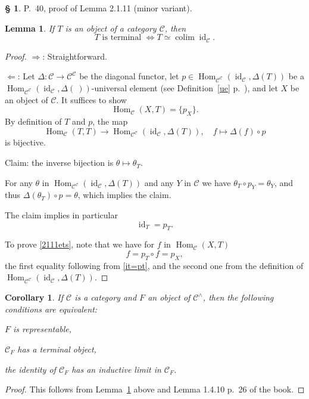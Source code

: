 \documentclass[12pt]{article}%
\newtheorem{lem}[thm]{Lemma}
\newtheorem{cor}[thm]{Corollary}
\theoremstyle{remark}
\theoremstyle{definition}
\newtheorem{s}[thm]{\S}%
\newcommand{\nn}{\noindent}
\newcommand{\C}{\mathcal C}
\newcommand{\si}{\Leftarrow}
\newcommand{\ssi}{\Leftrightarrow}%
\newcommand{\then}{\Rightarrow}
\DeclareMathOperator*{\colim}{colim}%
\DeclareMathOperator{\id}{id}
\DeclareMathOperator{\Hom}{Hom}%
\begin{document}
\begin{s} 
P.~40, proof of Lemma 2.1.11 (minor variant).

\begin{lem}\label{l2111}
If $T$ is an object of a category $\C$, then 
$$
T\text{ is terminal }\ssi T\simeq\colim\id_\C.
$$
\end{lem}

\begin{proof} $\then$: Straightforward.

\nn$\si$: Let $\Delta:\C\to\C^\C$ be the diagonal functor, let $p\in\Hom_{\C^\C}(\id_\C,\Delta(T))$ be a $\Hom_{\C^\C}(\id_\C,\Delta(\ ))$\--universal element  (see Definition~\ref{ue} p.~\pageref{ue}), and let $X$ be an object of $\C$. It suffices to show 
%
\begin{equation}\label{2111ets}
\Hom_\C(X,T)=\{p_X\}.
\end{equation}
% 
By definition of $T$ and $p$, the map 
$$
\Hom_\C(T,T)\to\Hom_{\C^\C}(\id_\C,\Delta(T)),\quad f\mapsto\Delta(f)\circ p 
$$ 
is bijective. 

Claim: the inverse bijection is $\theta\mapsto\theta_T$. 

For any $\theta$ in $\Hom_{\C^\C}(\id_\C,\Delta(T))$ and any $Y$ in $\C$ we have $\theta_T\circ p_Y=\theta_Y$, and thus $\Delta(\theta_T)\circ p=\theta$, which implies the claim. 

The claim implies in particular 
%
\begin{equation}\label{it=pt}
\id_T=p_T.
\end{equation}

To prove \eqref{2111ets}, note that we have for $f$ in $\Hom_\C(X,T)$
$$
f=p_T\circ f=p_X,
$$
the first equality following from \eqref{it=pt}, and the second one from the definition of $\Hom_{\C^\C}(\id_\C,\Delta(T))$.
\end{proof}

\begin{cor}\label{c2111}
If $\C$ is a category and $F$ an object of $\C^\wedge$, then the following conditions are equivalent:

\nn{\em(a)} $F$ is representable,

\nn{\em(b)} $\C_F$ has a terminal object,

\nn{\em(c)} the identity of $\C_F$ has an inductive limit in $\C_F$.
\end{cor}

\begin{proof}
This follows from Lemma~\ref{l2111} above and Lemma 1.4.10 p.~26 of the book.
\end{proof}
\end{s}
\end{document}
